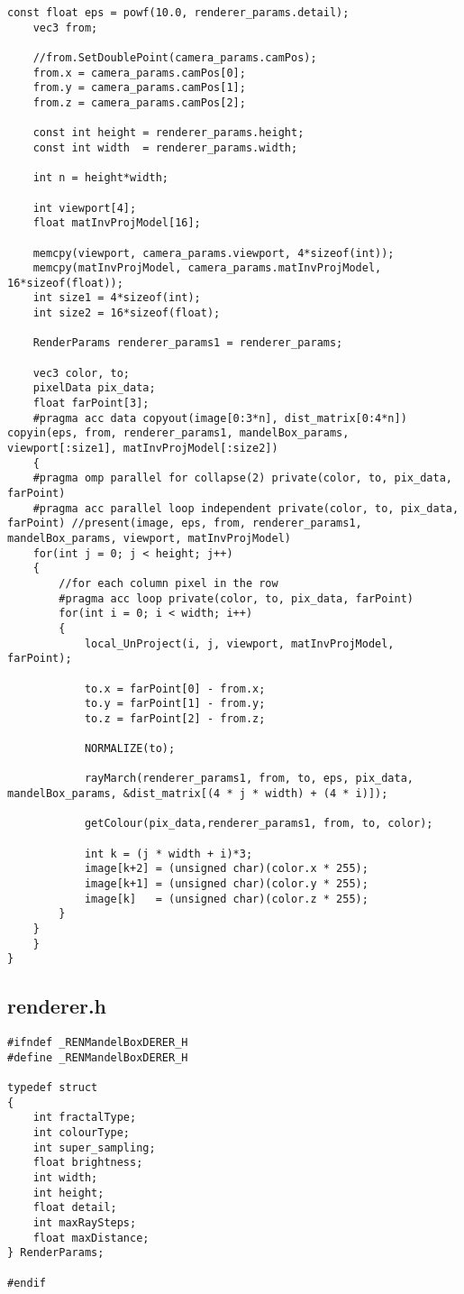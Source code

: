 \documentclass[]{article}
\begin{document}
\begin{Verbatim}[fontsize= \footnotesize, tabsize=4]
	const float eps = powf(10.0, renderer_params.detail);
	vec3 from;

	//from.SetDoublePoint(camera_params.camPos);
	from.x = camera_params.camPos[0];
	from.y = camera_params.camPos[1];
	from.z = camera_params.camPos[2];

	const int height = renderer_params.height;
	const int width  = renderer_params.width;

	int n = height*width;

	int viewport[4];
	float matInvProjModel[16];

	memcpy(viewport, camera_params.viewport, 4*sizeof(int));
	memcpy(matInvProjModel, camera_params.matInvProjModel, 16*sizeof(float));
	int size1 = 4*sizeof(int);
	int size2 = 16*sizeof(float);

	RenderParams renderer_params1 = renderer_params;

	vec3 color, to;
	pixelData pix_data;
	float farPoint[3];
	#pragma acc data copyout(image[0:3*n], dist_matrix[0:4*n]) copyin(eps, from, renderer_params1, mandelBox_params, viewport[:size1], matInvProjModel[:size2])
	{
	#pragma omp parallel for collapse(2) private(color, to, pix_data, farPoint)
	#pragma acc parallel loop independent private(color, to, pix_data, farPoint) //present(image, eps, from, renderer_params1, mandelBox_params, viewport, matInvProjModel)
	for(int j = 0; j < height; j++)
	{
		//for each column pixel in the row
		#pragma acc loop private(color, to, pix_data, farPoint)
		for(int i = 0; i < width; i++)
		{
			local_UnProject(i, j, viewport, matInvProjModel, farPoint);

			to.x = farPoint[0] - from.x;
			to.y = farPoint[1] - from.y;
			to.z = farPoint[2] - from.z;

			NORMALIZE(to);

			rayMarch(renderer_params1, from, to, eps, pix_data, mandelBox_params, &dist_matrix[(4 * j * width) + (4 * i)]);

			getColour(pix_data,renderer_params1, from, to, color);

			int k = (j * width + i)*3;
			image[k+2] = (unsigned char)(color.x * 255);
			image[k+1] = (unsigned char)(color.y * 255);
			image[k]   = (unsigned char)(color.z * 255);
		}
	}
	}
}
\end{Verbatim}

\subsection*{renderer.h}
\begin{Verbatim}[fontsize= \footnotesize, tabsize=4]
#ifndef _RENMandelBoxDERER_H
#define _RENMandelBoxDERER_H

typedef struct 
{
	int fractalType;
	int colourType;
	int super_sampling;
	float brightness;
	int width;
	int height;
	float detail;
	int maxRaySteps;
	float maxDistance;
} RenderParams;

#endif
\end{Verbatim}
\end{document}
